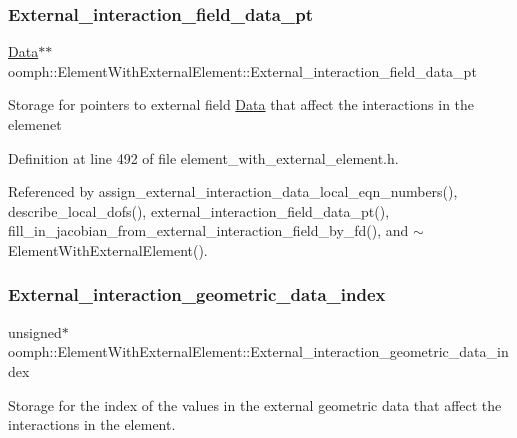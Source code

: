 \subsubsection{\texorpdfstring{External\+\_\+interaction\+\_\+field\+\_\+data\+\_\+pt}{External\_interaction\_field\_data\_pt}}
{\footnotesize\ttfamily \hyperlink{classoomph_1_1Data}{Data}$\ast$$\ast$ oomph\+::\+Element\+With\+External\+Element\+::\+External\+\_\+interaction\+\_\+field\+\_\+data\+\_\+pt\hspace{0.3cm}{\ttfamily [protected]}}

Storage for pointers to external field \hyperlink{classoomph_1_1Data}{Data} that affect the interactions in the elemenet 

Definition at line 492 of file element\+\_\+with\+\_\+external\+\_\+element.\+h.



Referenced by assign\+\_\+external\+\_\+interaction\+\_\+data\+\_\+local\+\_\+eqn\+\_\+numbers(), describe\+\_\+local\+\_\+dofs(), external\+\_\+interaction\+\_\+field\+\_\+data\+\_\+pt(), fill\+\_\+in\+\_\+jacobian\+\_\+from\+\_\+external\+\_\+interaction\+\_\+field\+\_\+by\+\_\+fd(), and $\sim$\+Element\+With\+External\+Element().

\mbox{\label{classoomph_1_1ElementWithExternalElement_aba1db798c02c38ae859b381c5d00b7dc}} 
\subsubsection{\texorpdfstring{External\+\_\+interaction\+\_\+geometric\+\_\+data\+\_\+index}{External\_interaction\_geometric\_data\_index}}
{\footnotesize\ttfamily unsigned$\ast$ oomph\+::\+Element\+With\+External\+Element\+::\+External\+\_\+interaction\+\_\+geometric\+\_\+data\+\_\+index\hspace{0.3cm}{\ttfamily [private]}}



Storage for the index of the values in the external geometric data that affect the interactions in the element. 



